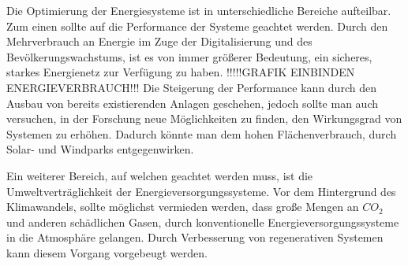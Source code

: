 Die Optimierung der Energiesysteme ist in unterschiedliche Bereiche aufteilbar.
Zum einen sollte auf die Performance der Systeme geachtet werden. Durch den
Mehrverbrauch an Energie im Zuge der Digitalisierung und des
Bevölkerungswachstums, ist es von immer größerer Bedeutung, ein sicheres,
starkes Energienetz zur Verfügung zu haben. !!!!!GRAFIK EINBINDEN
ENERGIEVERBRAUCH!!! Die Steigerung der Performance kann durch den Ausbau von
bereits existierenden Anlagen geschehen, jedoch sollte man auch versuchen, in
der Forschung neue Möglichkeiten zu finden, den Wirkungsgrad von Systemen zu
erhöhen. Dadurch könnte man dem hohen Flächenverbrauch, durch Solar- und
Windparks entgegenwirken.

Ein weiterer Bereich, auf welchen geachtet werden muss, ist die
Umweltverträglichkeit der Energieversorgungssysteme. Vor dem Hintergrund des
Klimawandels, sollte möglichst vermieden werden, dass große Mengen an $CO_2$ und
anderen schädlichen Gasen, durch konventionelle Energieversorgungssysteme in die Atmosphäre
gelangen. Durch Verbesserung von regenerativen Systemen kann diesem Vorgang vorgebeugt werden.